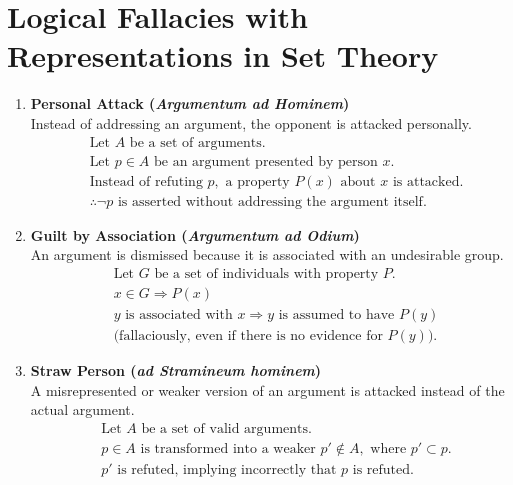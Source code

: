 
\section{Logical Fallacies with Representations in Set Theory}

\begin{enumerate}
    \item \textbf{Personal Attack (\textit{Argumentum ad Hominem})}  \\
    Instead of addressing an argument, the opponent is attacked personally.
    \begin{align*}
        &\text{Let } A \text{ be a set of arguments.} \\
        &\text{Let } p \in A \text{ be an argument presented by person } x. \\
        &\text{Instead of refuting } p, \text{ a property } P(x) \text{ about } x \text{ is attacked.} \\
        &\therefore \neg p \text{ is asserted without addressing the argument itself.}
    \end{align*}

    \item \textbf{Guilt by Association (\textit{Argumentum ad Odium})}  \\
    An argument is dismissed because it is associated with an undesirable group.
    \begin{align*}
        &\text{Let } G \text{ be a set of individuals with property } P. \\
        &x \in G \Rightarrow P(x) \\
        &y \text{ is associated with } x \Rightarrow y \text{ is assumed to have } P(y) \\
        &\text{(fallaciously, even if there is no evidence for } P(y)).
    \end{align*}

    \item \textbf{Straw Person (\textit{ad Stramineum hominem})}  \\
    A misrepresented or weaker version of an argument is attacked instead of the actual argument.
    \begin{align*}
        &\text{Let } A \text{ be a set of valid arguments.} \\
        &p \in A \text{ is transformed into a weaker } p' \notin A, \text{ where } p' \subset p. \\
        &p' \text{ is refuted, implying incorrectly that } p \text{ is refuted.}
    \end{align*}


\end{enumerate}
